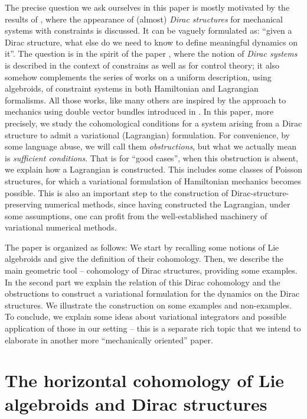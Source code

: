 \documentclass[a4paper,12pt]{amsart}
\theoremstyle{definition}
\begin{document}
The precise question we ask ourselves in this paper is mostly motivated by the results of \cite{RSHD}, where the appearance of (almost) \emph{Dirac structures} for mechanical systems with constraints is discussed. It can be vaguely formulated as: ``given a Dirac structure, what else do we need to know to define meaningful dynamics on it''. {The question is in the spirit of the paper \cite{morse}, where the notion of \emph{Dirac systems} is described in the context of constrains as well as for control theory; it also somehow complements the series of works \cite{dirac-algebroids, GG} on a uniform description, using algebroids, of constraint systems in both Hamiltonian and Lagrangian formalisms. All those works, like many others are inspired by the approach to mechanics using double vector bundles introduced in \cite{tulcz, tulcz2}. In this paper, more precisely, we study the cohomological  {conditions} for a system  arising from a Dirac structure to admit a variational (Lagrangian) formulation.}  {For convenience, by some language abuse, we will call them \emph{obstructions}, but what we actually mean is \emph{sufficient conditions}.  That is for ``good cases''}, when this obstruction is absent, we explain how a Lagrangian is constructed. This includes some classes of Poisson structures, for which a variational formulation of Hamiltonian mechanics becomes possible.  This is also an important step to the construction of Dirac-structure-preserving numerical methods, since having constructed the Lagrangian, under some assumptions, one can profit from the well-established machinery of variational numerical methods. 

The paper is organized as follows: 
We start by recalling some notions of Lie algebroids and give the definition of their cohomology. Then, we describe the main geometric tool -- cohomology of Dirac structures, providing some examples. In the second part we explain the relation of this Dirac cohomology and the obstructions to construct a variational formulation for the dynamics on the Dirac structures.
We illustrate the construction on some examples and non-examples.
To conclude, we explain some ideas about variational integrators and possible application of those in our setting -- this is a separate rich topic that we intend to elaborate in another more ``mechanically oriented'' paper.
 


\section{The  {horizontal} cohomology of Lie algebroids and Dirac structures}
\end{document}
